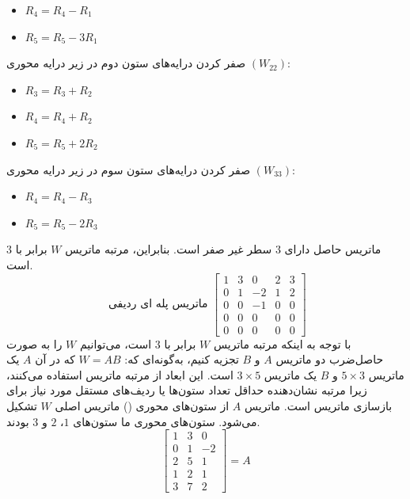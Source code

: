 \documentclass[12pt]{article}
\begin{document}
\begin{enumerate}
\begin{enumerate}
{\begin{itemize}
            \item $R_4 = R_4 - R_1$
            \item $R_5 = R_5 - 3R_1$
        \end{itemize}
        صفر کردن درایه‌های ستون دوم در زیر درایه محوری $(W_{22})$:  
        \begin{itemize}
            \item $R_3 = R_3 + R_2$
            \item $R_4 = R_4 + R_2$
            \item $R_5 = R_5 + 2R_2$
        \end{itemize}
        صفر کردن درایه‌های ستون سوم در زیر درایه محوری $(W_{33})$:  
        \begin{itemize}
            \item $R_4 = R_4 - R_3$
            \item $R_5 = R_5 - 2R_3$
        \end{itemize}
        ماتریس حاصل دارای $3$ سطر غیر صفر است. بنابراین، مرتبه ماتریس $W$ برابر با $3$ است.\\
        $$
        \text { ماتریس پله ای ردیفی }\left[\begin{array}{ccccc}
        1 & 3 & 0 & 2 & 3 \\
        0 & 1 & -2 & 1 & 2 \\
        0 & 0 & -1 & 0 & 0 \\
        0 & 0 & 0 & 0 & 0 \\
        0 & 0 & 0 & 0 & 0
        \end{array}\right]
        $$
        با توجه به اینکه مرتبه ماتریس $W$ برابر با $3$ است، می‌توانیم $W$ را به صورت حاصل‌ضرب دو ماتریس $A$ و $B$ تجزیه کنیم، به‌گونه‌ای که: $W = A B$
        که در آن $A$ یک ماتریس $5 \times 3$ و $B$ یک ماتریس $3 \times 5$ است.  
        این ابعاد از مرتبه ماتریس استفاده می‌کنند، زیرا مرتبه نشان‌دهنده حداقل تعداد ستون‌ها یا ردیف‌های مستقل مورد نیاز برای بازسازی ماتریس است.  
        ماتریس $A$ از ستون‌های محوری () ماتریس اصلی $W$ تشکیل می‌شود. ستون‌های محوری ما ستون‌های $1$، $2$ و $3$ بودند.  
        $$
        \left[\begin{array}{ccc}
        1 & 3 & 0 \\
        0 & 1 & -2 \\
        2 & 5 & 1 \\
        1 & 2 & 1 \\
        3 & 7 & 2
        \end{array}\right]=A
        $$\\
}
\end{enumerate}
\end{enumerate}
\end{document}
